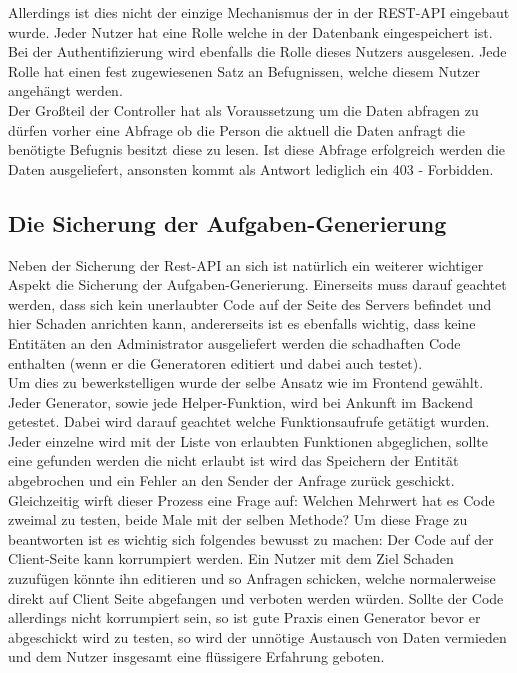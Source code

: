 \begin{enumerate}
Allerdings ist dies nicht der einzige Mechanismus der in der REST-API eingebaut wurde. Jeder Nutzer hat eine Rolle welche in der Datenbank eingespeichert ist. Bei der Authentifizierung wird ebenfalls die Rolle dieses Nutzers ausgelesen. Jede Rolle hat einen fest zugewiesenen Satz an Befugnissen, welche diesem Nutzer angehängt werden. \\
Der Großteil der Controller hat als Voraussetzung um die Daten abfragen zu dürfen vorher eine Abfrage ob die Person die aktuell die Daten anfragt die benötigte Befugnis besitzt diese zu lesen. Ist diese Abfrage erfolgreich werden die Daten ausgeliefert, ansonsten kommt als Antwort lediglich ein 403 - Forbidden.

\subsection{Die Sicherung der Aufgaben-Generierung}\label{GenerateTaskChapter}

Neben der Sicherung der Rest-API an sich ist natürlich ein weiterer wichtiger Aspekt die Sicherung der Aufgaben-Generierung. Einerseits muss darauf geachtet werden, dass sich kein unerlaubter Code auf der Seite des Servers befindet und hier Schaden anrichten kann, andererseits ist es ebenfalls wichtig, dass keine Entitäten an den Administrator ausgeliefert werden die schadhaften Code enthalten (wenn er die Generatoren editiert und dabei auch testet). \\

Um dies zu bewerkstelligen wurde der selbe Ansatz wie im Frontend gewählt. Jeder Generator, sowie jede Helper-Funktion, wird bei Ankunft im Backend getestet. Dabei wird darauf geachtet welche Funktionsaufrufe getätigt wurden. Jeder einzelne wird mit der Liste von erlaubten Funktionen abgeglichen, sollte eine gefunden werden die nicht erlaubt ist wird das Speichern der Entität abgebrochen und ein Fehler an den Sender der Anfrage zurück geschickt. \\

Gleichzeitig wirft dieser Prozess eine Frage auf: Welchen Mehrwert hat es Code zweimal zu testen, beide Male mit der selben Methode? Um diese Frage zu beantworten ist es wichtig sich folgendes bewusst zu machen: Der Code auf der Client-Seite kann korrumpiert werden. Ein Nutzer mit dem Ziel Schaden zuzufügen könnte ihn editieren und so Anfragen schicken, welche normalerweise direkt auf Client Seite abgefangen und verboten werden würden. Sollte der Code allerdings nicht korrumpiert sein, so ist gute Praxis einen Generator bevor er abgeschickt wird zu testen, so wird der unnötige Austausch von Daten vermieden und dem Nutzer insgesamt eine flüssigere Erfahrung geboten.



\end{enumerate}
